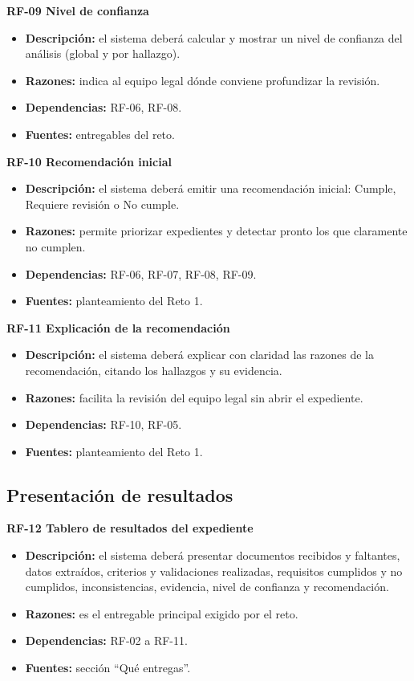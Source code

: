 \documentclass[11pt, a4paper]{article}
\begin{document}
\textbf{RF-09 Nivel de confianza}
\begin{itemize}
    \item \textbf{Descripción:} el sistema deberá calcular y mostrar un nivel de confianza del análisis (global y por hallazgo).
    \item \textbf{Razones:} indica al equipo legal dónde conviene profundizar la revisión.
    \item \textbf{Dependencias:} RF-06, RF-08.
    \item \textbf{Fuentes:} entregables del reto.
\end{itemize}

\textbf{RF-10 Recomendación inicial}
\begin{itemize}
    \item \textbf{Descripción:} el sistema deberá emitir una recomendación inicial: Cumple, Requiere revisión o No cumple.
    \item \textbf{Razones:} permite priorizar expedientes y detectar pronto los que claramente no cumplen.
    \item \textbf{Dependencias:} RF-06, RF-07, RF-08, RF-09.
    \item \textbf{Fuentes:} planteamiento del Reto 1.
\end{itemize}

\textbf{RF-11 Explicación de la recomendación}
\begin{itemize}
    \item \textbf{Descripción:} el sistema deberá explicar con claridad las razones de la recomendación, citando los hallazgos y su evidencia.
    \item \textbf{Razones:} facilita la revisión del equipo legal sin abrir el expediente.
    \item \textbf{Dependencias:} RF-10, RF-05.
    \item \textbf{Fuentes:} planteamiento del Reto 1.
\end{itemize}

\subsection*{Presentación de resultados}

\textbf{RF-12 Tablero de resultados del expediente}
\begin{itemize}
    \item \textbf{Descripción:} el sistema deberá presentar documentos recibidos y faltantes, datos extraídos, criterios y validaciones realizadas, requisitos cumplidos y no cumplidos, inconsistencias, evidencia, nivel de confianza y recomendación.
    \item \textbf{Razones:} es el entregable principal exigido por el reto.
    \item \textbf{Dependencias:} RF-02 a RF-11.
    \item \textbf{Fuentes:} sección ``Qué entregas''.
\end{itemize}
\end{document}
